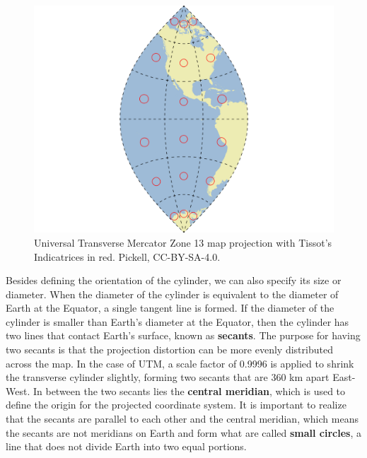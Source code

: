 \documentclass[
]{book}
\begin{document}
\begin{figure}
\includegraphics[width=0.75\linewidth]{images/02-UTM-13N-map} \caption{Universal Transverse Mercator Zone 13 map projection with Tissot's Indicatrices in red. Pickell, CC-BY-SA-4.0.}\label{fig:2-UTM-13N-map}
\end{figure}

Besides defining the orientation of the cylinder, we can also specify its size or diameter. When the diameter of the cylinder is equivalent to the diameter of Earth at the Equator, a single tangent line is formed. If the diameter of the cylinder is smaller than Earth's diameter at the Equator, then the cylinder has two lines that contact Earth's surface, known as \textbf{secants}. The purpose for having two secants is that the projection distortion can be more evenly distributed across the map. In the case of UTM, a scale factor of 0.9996 is applied to shrink the transverse cylinder slightly, forming two secants that are 360 km apart East-West. In between the two secants lies the \textbf{central meridian}, which is used to define the origin for the projected coordinate system. It is important to realize that the secants are parallel to each other and the central meridian, which means the secants are not meridians on Earth and form what are called \textbf{small circles}, a line that does not divide Earth into two equal portions.
\end{document}
